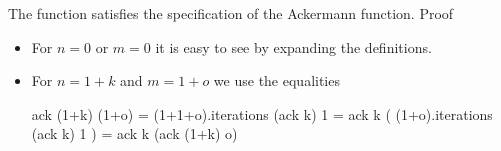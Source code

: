 The function  satisfies the specification of the Ackermann
function. Proof
\begin{itemize}

\item For $n = 0$ or $m = 0$ it is easy to see by expanding the definitions.

\item For $n = 1+k$ and $m = 1+o$ we use the equalities
  \begin{alba}
    ack (1+k) (1+o) = (1+1+o).iterations (ack k) 1
                    = ack k ( (1+o).iterations (ack k) 1 )
                    = ack k (ack (1+k) o)
  \end{alba}
\end{itemize}










